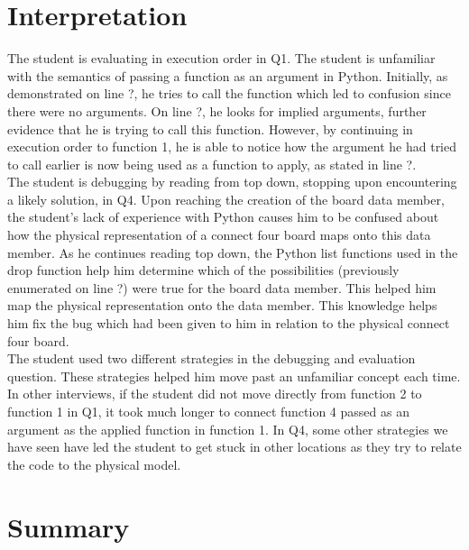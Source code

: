 \documentclass{article}
\begin{document}
\section{Interpretation}

The student is evaluating in execution order in Q1. The student is unfamiliar with the semantics of passing a function as an argument in Python. Initially, as demonstrated on line ?, he tries to call the function which led to confusion since there were no arguments. On line ?, he looks for implied arguments, further evidence that he is trying to call this function. However, by continuing in execution order to function 1, he is able to notice how the argument he had tried to call earlier is now being used as a function to apply, as stated in line ?.  \\

The student is debugging by reading from top down, stopping upon encountering a likely solution, in Q4. Upon reaching the creation of the board data member, the student's lack of experience with Python causes him to be confused about how the physical representation of a connect four board maps onto this data member. As he continues reading top down, the Python list functions used in the drop function help him determine which of the possibilities (previously enumerated on line ?) were true for the board data member. This helped him map the physical representation onto the data member. This knowledge helps him fix the bug which had been given to him in relation to the physical connect four board.  \\

The student used two different strategies in the debugging and evaluation question. These strategies helped him move past an unfamiliar concept each time. In other interviews, if the student did not move directly from function 2 to function 1 in Q1, it took much longer to connect function 4 passed as an argument as the applied function in function 1. In Q4, some other strategies we have seen have led the student to get stuck in other locations as they try to relate the code to the physical model. 







\section{Summary}
\end{document}
